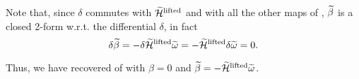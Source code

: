 Note that, since $\delta$ commutes with $\widetilde{\mathcal{H}}^\text{lifted}$ and with all the other maps of , $\widetilde{\beta}$ is a closed 2-form w.r.t. the differential $\delta$, in fact
\begin{equation*}
    \delta \widetilde{\beta} = 
    - \delta \widetilde{\mathcal{H}}^\text{lifted} \widetilde{\omega} =
    - \widetilde{\mathcal{H}}^\text{lifted} \delta \widetilde{\omega} =
    0 .
\end{equation*}

Thus, we have recovered  of  with $\beta = 0$ and $\widetilde{\beta}=- \widetilde{\mathcal{H}}^\text{lifted} \widetilde{\omega}$.